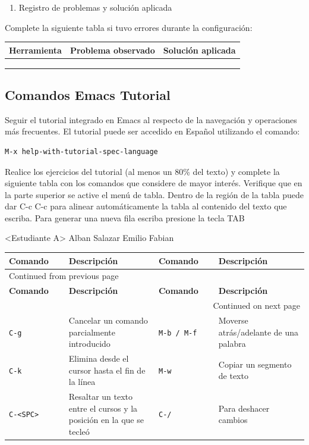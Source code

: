 \documentclass{article}
\begin{document}
\begin{enumerate}
\item Registro de problemas y solución aplicada
\end{enumerate}

Complete la siguiente tabla si tuvo errores durante la configuración:

\begin{center}
\begin{tabularx}{\textwidth}{lXX}
\textbf{Herramienta} & \textbf{Problema observado} & \textbf{Solución aplicada}\\[0pt]
\hline
 &  & \\[0pt]
 &  & \\[0pt]
 &  & \\[0pt]
\end{tabularx}
\end{center}

\subsection{Comandos Emacs Tutorial}
\label{sec:orgd1c14be}
Seguir el tutorial integrado en Emacs al respecto de la navegación y
operaciones más frecuentes. El tutorial puede ser accedido en Español
utilizando el comando:

\begin{verbatim}
M-x help-with-tutorial-spec-language
\end{verbatim}

Realice los ejercicios del tutorial (al menos un 80\% del texto) y
complete la siguiente tabla con los comandos que considere de mayor
interés. Verifique que en la parte superior se active el menú de
tabla. Dentro de la región de la tabla puede dar C-c C-c para alinear
automáticamente la tabla al contenido del texto que escriba. Para
generar una nueva fila escriba presione la tecla TAB

<Estudiante A> Alban Salazar Emilio Fabian
\begin{longtable}{|p{0.2\linewidth}|p{0.3\linewidth}|p{0.2\linewidth}|p{0.3\linewidth}|}
\textbf{Comando} & \textbf{Descripción} & \textbf{Comando} & \textbf{Descripción}\\[0pt]
\hline
\endfirsthead
\multicolumn{4}{l}{Continued from previous page} \\[0pt]
\hline

\textbf{Comando} & \textbf{Descripción} & \textbf{Comando} & \textbf{Descripción} \\[0pt]

\hline
\endhead
\hline\multicolumn{4}{r}{Continued on next page} \\
\endfoot
\endlastfoot
\hline
\texttt{C-g} & Cancelar un comando parcialmente introducido & \texttt{M-b / M-f} & Moverse atrás/adelante de una palabra\\[0pt]
\texttt{C-k} & Elimina desde el cursor hasta el fin de la línea & \texttt{M-w} & Copiar un segmento de texto\\[0pt]
\texttt{C-<SPC>} & Resaltar un texto entre el cursos y la posición en la que se tecleó & \texttt{C-/} & Para deshacer cambios\\[0pt]
\end{longtable}
\end{document}
